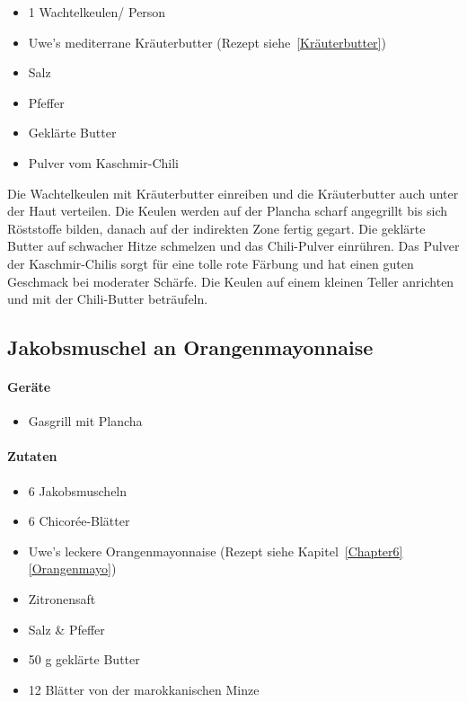 \begin{itemize}[noitemsep]
	\item 1 Wachtelkeulen/ Person
	\item Uwe's mediterrane Kräuterbutter (Rezept siehe~\vref{Kräuterbutter})
	\item Salz
	\item Pfeffer
	\item Geklärte Butter
	\item Pulver vom Kaschmir-Chili
\end{itemize}

Die Wachtelkeulen mit Kräuterbutter einreiben und die Kräuterbutter auch unter der Haut verteilen. Die Keulen werden auf der Plancha scharf 
angegrillt bis sich Röststoffe bilden, danach auf der indirekten Zone fertig gegart. Die geklärte Butter auf schwacher Hitze schmelzen und das 
Chili-Pulver einrühren. Das Pulver der Kaschmir-Chilis sorgt für eine tolle rote Färbung und hat einen guten  Geschmack bei moderater Schärfe. 
Die Keulen auf einem kleinen Teller anrichten und mit der Chili-Butter beträufeln.

\subsection{Jakobsmuschel an Orangenmayonnaise}

\paragraph{Geräte}

\begin{itemize}
	\item Gasgrill mit Plancha
\end{itemize}

\paragraph{Zutaten}

\begin{itemize}[noitemsep]
	\item 6 Jakobsmuscheln
	\item 6 Chicorée-Blätter
	\item Uwe's leckere Orangenmayonnaise (Rezept siehe 
	Kapitel~\ref{Chapter6} \vref{Orangenmayo})
	\item Zitronensaft
	\item Salz \& Pfeffer
	\item 50 g geklärte Butter
	\item 12 Blätter von der marokkanischen Minze
\end{itemize}

